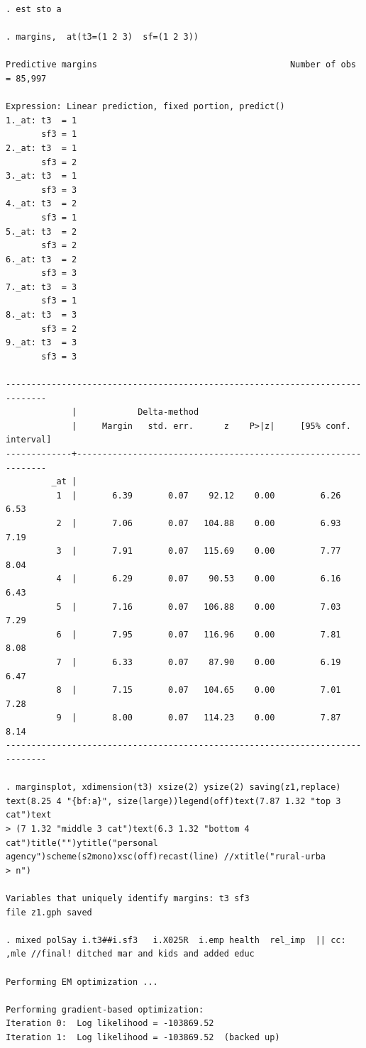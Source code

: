 \documentclass[10pt, letterpaper]{article}
\begin{document}
\begin{spacing}{1.4}
\begin{scriptsize}
\begin{spacing}{.19}
\begin{verbatim}
. est sto a                

. margins,  at(t3=(1 2 3)  sf=(1 2 3))

Predictive margins                                      Number of obs = 85,997

Expression: Linear prediction, fixed portion, predict()
1._at: t3  = 1
       sf3 = 1
2._at: t3  = 1
       sf3 = 2
3._at: t3  = 1
       sf3 = 3
4._at: t3  = 2
       sf3 = 1
5._at: t3  = 2
       sf3 = 2
6._at: t3  = 2
       sf3 = 3
7._at: t3  = 3
       sf3 = 1
8._at: t3  = 3
       sf3 = 2
9._at: t3  = 3
       sf3 = 3

------------------------------------------------------------------------------
             |            Delta-method
             |     Margin   std. err.      z    P>|z|     [95% conf. interval]
-------------+----------------------------------------------------------------
         _at |
          1  |       6.39       0.07    92.12    0.00         6.26        6.53
          2  |       7.06       0.07   104.88    0.00         6.93        7.19
          3  |       7.91       0.07   115.69    0.00         7.77        8.04
          4  |       6.29       0.07    90.53    0.00         6.16        6.43
          5  |       7.16       0.07   106.88    0.00         7.03        7.29
          6  |       7.95       0.07   116.96    0.00         7.81        8.08
          7  |       6.33       0.07    87.90    0.00         6.19        6.47
          8  |       7.15       0.07   104.65    0.00         7.01        7.28
          9  |       8.00       0.07   114.23    0.00         7.87        8.14
------------------------------------------------------------------------------

. marginsplot, xdimension(t3) xsize(2) ysize(2) saving(z1,replace) text(8.25 4 "{bf:a}", size(large))legend(off)text(7.87 1.32 "top 3 cat")text
> (7 1.32 "middle 3 cat")text(6.3 1.32 "bottom 4 cat")title("")ytitle("personal agency")scheme(s2mono)xsc(off)recast(line) //xtitle("rural-urba
> n")

Variables that uniquely identify margins: t3 sf3
file z1.gph saved

. mixed polSay i.t3##i.sf3   i.X025R  i.emp health  rel_imp  || cc:    ,mle //final! ditched mar and kids and added educ

Performing EM optimization ...

Performing gradient-based optimization: 
Iteration 0:  Log likelihood = -103869.52  
Iteration 1:  Log likelihood = -103869.52  (backed up)


\end{verbatim}
\end{spacing}
\end{scriptsize}
\end{spacing}
\end{document}

